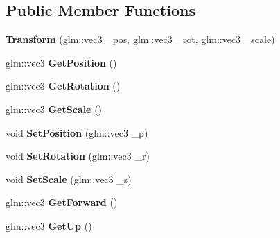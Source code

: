 \subsection*{Public Member Functions}
\begin{DoxyCompactItemize}
\item 
\mbox{\label{class_indigo_1_1_transform_ab1aaf133b18dcd920fcdcbe93edc548e}} 
{\bfseries Transform} (glm\+::vec3 \+\_\+pos, glm\+::vec3 \+\_\+rot, glm\+::vec3 \+\_\+scale)
\item 
\mbox{\label{class_indigo_1_1_transform_a71ade761a10a7ae77567928a36021320}} 
glm\+::vec3 {\bfseries Get\+Position} ()
\item 
\mbox{\label{class_indigo_1_1_transform_a0c9d4e095d96472142732b4f06219e8f}} 
glm\+::vec3 {\bfseries Get\+Rotation} ()
\item 
\mbox{\label{class_indigo_1_1_transform_a42d36bf23efe1a84d28d54a6784f6eb0}} 
glm\+::vec3 {\bfseries Get\+Scale} ()
\item 
\mbox{\label{class_indigo_1_1_transform_aa4ffc305632fa25aeed22524b36e3e79}} 
void {\bfseries Set\+Position} (glm\+::vec3 \+\_\+p)
\item 
\mbox{\label{class_indigo_1_1_transform_a7e7618374106c5df66f8831d109c598f}} 
void {\bfseries Set\+Rotation} (glm\+::vec3 \+\_\+r)
\item 
\mbox{\label{class_indigo_1_1_transform_a221016e4719c6e990bbe98e0e581f926}} 
void {\bfseries Set\+Scale} (glm\+::vec3 \+\_\+s)
\item 
\mbox{\label{class_indigo_1_1_transform_aefe0c69065a9870dc0c49d297dc316c5}} 
glm\+::vec3 {\bfseries Get\+Forward} ()
\item 
\mbox{\label{class_indigo_1_1_transform_a9d87de590be3b413b962ca5a1c90c0ef}} 
glm\+::vec3 {\bfseries Get\+Up} ()
\item 
\mbox{\label{class_indigo_1_1_transform_a7e34c4791358814412983d8606cc4cdf}} 

\end{DoxyCompactItemize}
